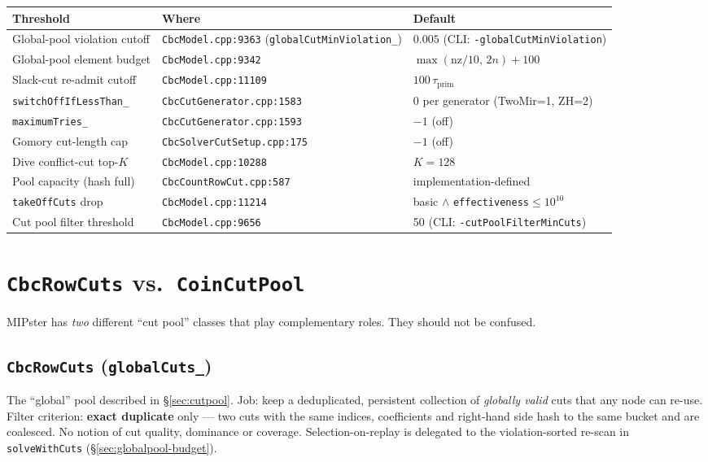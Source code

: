\documentclass[11pt,a4paper]{article}
\begin{document}
\begin{longtable}{p{4.5cm}p{4.5cm}p{4.5cm}}
\toprule
\textbf{Threshold} & \textbf{Where} & \textbf{Default}\\
\midrule
\endhead
Global-pool violation cutoff   & \texttt{CbcModel.cpp:9363}
  (\texttt{globalCutMinViolation\_})   & $0.005$ (CLI: \texttt{-globalCutMinViolation})\\
Global-pool element budget     & \texttt{CbcModel.cpp:9342}        & $\max(\text{nz}/10,\,2n)+100$\\
Slack-cut re-admit cutoff      & \texttt{CbcModel.cpp:11109}       & $100\,\tau_{\text{prim}}$\\
\texttt{switchOffIfLessThan\_} & \texttt{CbcCutGenerator.cpp:1583} & 0 per generator (TwoMir=1, ZH=2)\\
\texttt{maximumTries\_}        & \texttt{CbcCutGenerator.cpp:1593} & $-1$ (off)\\
Gomory cut-length cap          & \texttt{CbcSolverCutSetup.cpp:175}& $-1$ (off)\\
Dive conflict-cut top-$K$      & \texttt{CbcModel.cpp:10288}       & $K=128$\\
Pool capacity (hash full)      & \texttt{CbcCountRowCut.cpp:587}   & implementation-defined\\
\texttt{takeOffCuts} drop      & \texttt{CbcModel.cpp:11214}       & basic $\wedge$ \texttt{effectiveness}$\le 10^{10}$\\
Cut pool filter threshold      & \texttt{CbcModel.cpp:9656}        & 50 (CLI: \texttt{-cutPoolFilterMinCuts})\\
\bottomrule
\end{longtable}

\section{\texttt{CbcRowCuts} vs.\ \texttt{CoinCutPool}}
\label{sec:cutpool-vs-coincutpool}

MIPster has \emph{two} different ``cut pool'' classes that play
complementary roles.  They should not be confused.

\subsection*{\texttt{CbcRowCuts} (\texttt{globalCuts\_})}

The ``global'' pool described in \S\ref{sec:cutpool}.  Job: keep a
deduplicated, persistent collection of \emph{globally valid} cuts
that any node can re-use.  Filter criterion: \textbf{exact
duplicate} only --- two cuts with the same indices, coefficients
and right-hand side hash to the same bucket and are coalesced.  No
notion of cut quality, dominance or coverage.  Selection-on-replay
is delegated to the violation-sorted re-scan in
\texttt{solveWithCuts} (\S\ref{sec:globalpool-budget}).
\end{document}
